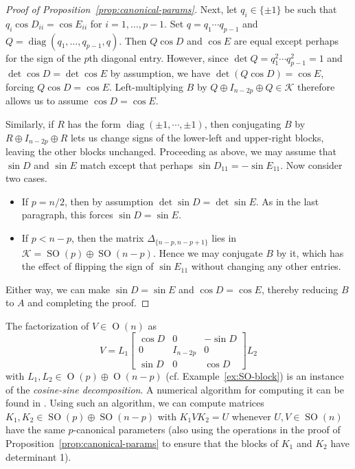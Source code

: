 \documentclass[reqno]{amsart}
\theoremstyle{definition} \newtheorem{example}[theorem]{Example}
\newcommand{\SO}{\operatorname{SO}}
\renewcommand{\O}{\operatorname{O}}
\newcommand{\diag}{\operatorname{diag}}
\newcommand{\K}{\mathcal{K}}
\begin{document}
\begin{proof}[Proof of Proposition~\ref{prop:canonical-params}]
Next, let $q_i \in \{\pm 1\}$ be such that $q_i \cos D_{ii} = \cos E_{ii}$ for $i = 1,\ldots,p-1$. Set $q = q_1 \cdots q_{p-1}$ and $Q = \diag(q_1, \ldots, q_{p-1}, q)$. Then $Q \cos D$ and $\cos E$ are equal except perhaps for the sign of the $p$th diagonal entry. However, since $\det Q = q_1^2 \cdots q_{p-1}^2 = 1$ and $\det \cos D = \det \cos E$ by assumption, we have $\det(Q \cos D) = \cos E$, forcing $Q \cos D = \cos E$. Left-multiplying $B$ by $Q \oplus I_{n-2p} \oplus Q \in \K$ therefore allows us to assume $\cos D = \cos E$.

Similarly, if $R$ has the form $\diag(\pm 1, \cdots, \pm 1)$, then conjugating $B$ by $R \oplus I_{n-2p} \oplus R$ lets us change signs of the lower-left and upper-right blocks, leaving the other blocks unchanged. Proceeding as above, we may assume that $\sin D$ and $\sin E$ match except that perhaps $\sin D_{11} = -\sin E_{11}$. Now consider two cases.
\begin{itemize}
\item If $p = n/2$, then by assumption $\det \sin D = \det \sin E$. As in the last paragraph, this forces $\sin D = \sin E$.
\item If $p < n-p$, then the matrix $\Delta_{\{n-p,n-p+1\}}$ lies in $\K = \SO(p) \oplus \SO(n-p)$. Hence we may conjugate $B$ by it, which has the effect of flipping the sign of $\sin E_{11}$ without changing any other entries.
\end{itemize}
Either way, we can make $\sin D = \sin E$ and $\cos D = \cos E$, thereby reducing $B$ to $A$ and completing the proof.
\end{proof}

The factorization of $V \in \O(n)$ as
\begin{equation*}
V = L_1 \begin{bmatrix} \cos D & 0 & -\sin D \\ 0 & I_{n-2p} & 0 \\ \sin D & 0 & \cos  D \end{bmatrix} L_2
\end{equation*}
with $L_1,L_2 \in \O(p) \oplus \O(n-p)$ (cf. Example~\ref{ex:SO-block}) is an instance of the \emph{cosine-sine decomposition}. A numerical algorithm for computing it can be found in \cite{sutton-cosine-sine}. Using such an algorithm, we can compute matrices $K_1,K_2 \in \SO(p) \oplus \SO(n-p)$ with $K_1 V K_2 = U$ whenever $U,V \in \SO(n)$ have the same $p$-canonical parameters (also using the operations in the proof of Proposition~\ref{prop:canonical-params} to ensure that the blocks of $K_1$ and $K_2$ have determinant 1).
\end{document}
